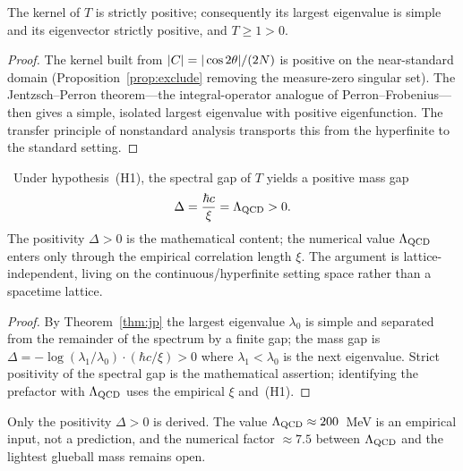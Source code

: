 \documentclass[11pt]{article}
\begin{document}
\begin{theorem}\label{thm:jp}
The kernel of $T$ is strictly positive; consequently its largest eigenvalue is simple and
its eigenvector strictly positive, and $T\ge 1>0$.
\end{theorem}

\begin{proof}
The kernel built from $|C|=|\cos2\theta|/(2N)$ is positive on the near-standard domain
(Proposition~\ref{prop:exclude} removing the measure-zero singular set). The
Jentzsch--Perron theorem---the integral-operator analogue of Perron--Frobenius---then gives
a simple, isolated largest eigenvalue with positive eigenfunction. The transfer principle
of nonstandard analysis transports this from the hyperfinite to the standard setting.
\end{proof}

\begin{theorem}\label{thm:gap}
\conditional\ Under hypothesis~(H1), the spectral gap of $T$ yields a positive mass gap
\begin{equation}
\Delta=\frac{\hbar c}{\xi}=\Lambda_{\mathrm{QCD}}>0 .
\end{equation}
The positivity $\Delta>0$ is the mathematical content; the numerical value $\Lambda_{\mathrm{QCD}}$ enters
only through the empirical correlation length $\xi$. The argument is lattice-independent,
living on the continuous/hyperfinite setting space rather than a spacetime lattice.
\end{theorem}

\begin{proof}
By Theorem~\ref{thm:jp} the largest eigenvalue $\lambda_0$ is simple and separated from the
remainder of the spectrum by a finite gap; the mass gap is $\Delta=-\log(\lambda_1/\lambda_0)
\cdot(\hbar c/\xi)>0$ where $\lambda_1<\lambda_0$ is the next eigenvalue. Strict positivity
of the spectral gap is the mathematical assertion; identifying the prefactor with $\Lambda_{\mathrm{QCD}}$
uses the empirical $\xi$ and~(H1).
\end{proof}

\begin{remark}\label{rem:gap-claim}
Only the positivity $\Delta>0$ is derived. The value $\Lambda_{\mathrm{QCD}}\approx200$~MeV is an
empirical input, not a prediction, and the numerical factor $\approx7.5$ between $\Lambda_{\mathrm{QCD}}$
and the lightest glueball mass remains open.
\end{remark}

\end{document}
